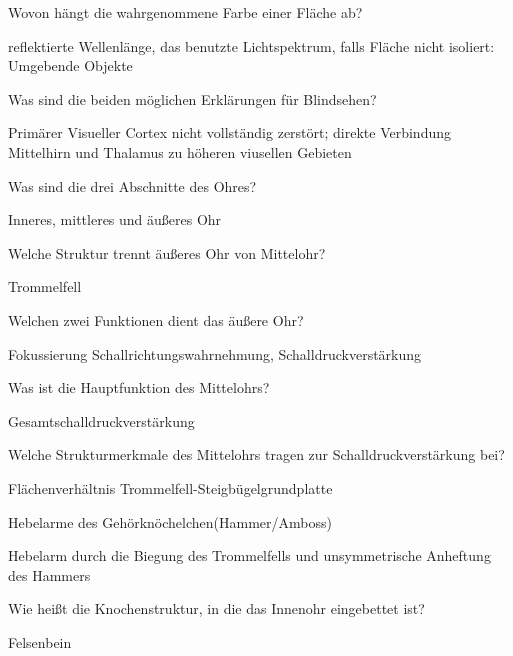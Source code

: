 \documentclass[10pt, a4paper]{exam}
\begin{document}
\begin{questions}
  \question Wovon hängt die wahrgenommene Farbe einer Fläche ab?
  \begin{solution}
    reflektierte Wellenlänge, das benutzte Lichtspektrum, falls Fläche nicht isoliert: Umgebende Objekte
  \end{solution}

  \question Was sind die beiden möglichen Erklärungen für Blindsehen?
  \begin{solution}
    Primärer Visueller Cortex nicht vollständig zerstört; direkte Verbindung Mittelhirn und Thalamus zu höheren viusellen Gebieten
  \end{solution}

  \question Was sind die drei Abschnitte des Ohres?
  \begin{solution}
    Inneres, mittleres und äußeres Ohr
  \end{solution}

  \question Welche Struktur trennt äußeres Ohr von Mittelohr?
  \begin{solution}
    Trommelfell
  \end{solution}

  \question Welchen zwei Funktionen dient das äußere Ohr?
  \begin{solution}
    Fokussierung Schallrichtungswahrnehmung, Schalldruckverstärkung
  \end{solution}

  \question Was ist die Hauptfunktion des Mittelohrs?
  \begin{solution}
    Gesamtschalldruckverstärkung
  \end{solution}

  \question Welche Strukturmerkmale des Mittelohrs tragen zur Schalldruckverstärkung bei?
  \begin{solution}
    \begin{itemize*}
      \item Flächenverhältnis Trommelfell-Steigbügelgrundplatte
      \item Hebelarme des Gehörknöchelchen(Hammer/Amboss)
      \item Hebelarm durch die Biegung des Trommelfells und unsymmetrische Anheftung des Hammers
    \end{itemize*}
  \end{solution}

  \question Wie heißt die Knochenstruktur, in die das Innenohr eingebettet ist?
  \begin{solution}
    Felsenbein
  \end{solution}


\end{questions}
\end{document}
